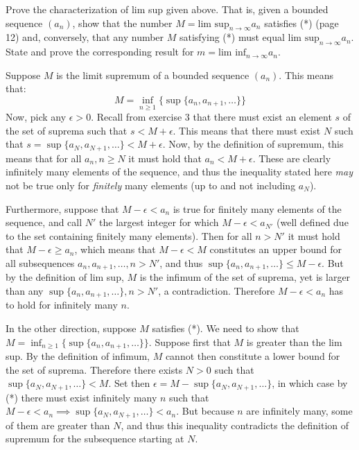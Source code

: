 \begin{exercise}{26}
    Prove the characterization of lim sup given above. That is, given a bounded sequence $(a_n)$, show that the number $M = \text{lim sup}_{n \rightarrow \infty} a_n$ satisfies (*) (page 12) and, conversely, that any number $M$ satisfying (*) must equal $\text{lim sup}_{n \rightarrow \infty} a_n$. State and prove the corresponding result for $m = \text{lim inf}_{n \rightarrow \infty} a_n$.
\end{exercise}

\begin{solution}

    Suppose $M$ is the limit supremum of a bounded sequence $(a_n)$. This means that:
    $$M = \inf_{n\geq 1}\{\sup\{a_n, a_{n+1}, \ldots\}\}$$
    Now, pick any $\epsilon > 0$. Recall from exercise 3 that there must exist an element $s$ of the set of suprema such that $s < M + \epsilon$. This means that there must exist $N$ such that $s = \sup\{a_N, a_{N+1}, \ldots\} < M + \epsilon$. Now, by the definition of supremum, this means that for all $a_n, n \geq N$ it must hold that $a_n < M + \epsilon$. These are clearly infinitely many elements of the sequence, and thus the inequality stated here \textit{may} not be true only for \textit{finitely} many elements (up to and not including $a_N$). 
    
    Furthermore, suppose that $M - \epsilon < a_n$ is true for finitely many elements of the sequence, and call $N'$ the largest integer for which $M - \epsilon < a_{N'}$ (well defined due to the set containing finitely many elements). Then for all $n > N'$ it must hold that $M - \epsilon \geq a_n$, which means that $M - \epsilon < M$ constitutes an upper bound for all subsequences $a_n, a_{n+1}, \ldots, n > N'$, and thus $\sup\{a_n, a_{n+1}, \ldots\} \leq M - \epsilon$. But by the definition of lim sup, $M$ is the infimum of the set of suprema, yet is larger than any $\sup\{a_n, a_{n+1}, \ldots\}, n > N'$, a contradiction. Therefore $M - \epsilon < a_n$ has to hold for infinitely many $n$.

    In the other direction, suppose $M$ satisfies (*). We need to show that $M = \inf_{n\geq 1}\{\sup\{a_n, a_{n+1}, \ldots\}\}$. Suppose first that $M$ is greater than the lim sup. By the definition of infimum, $M$ cannot then constitute a lower bound for the set of suprema. Therefore there exists $N > 0$ such that $\sup\{a_N, a_{N+1}, \ldots\} < M$. Set then $\epsilon = M - \sup\{a_N, a_{N+1}, \ldots\}$, in which case by (*) there must exist infinitely many $n$ such that $M - \epsilon < a_n \implies \sup\{a_N, a_{N+1}, \ldots\} < a_n$. But because $n$ are infinitely many, some of them are greater than $N$, and thus this inequality contradicts the definition of supremum for the subsequence starting at $N$. 
    

\end{solution}
